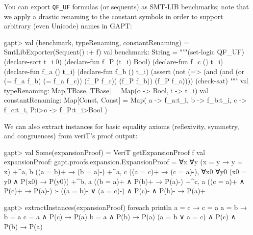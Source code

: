 \documentclass[a4paper,11pt]{book}
\begin{document}
You can export \verb,QF_UF, formulas (or sequents) as SMT-LIB benchmarks;
note that we apply a drastic renaming to the constant symbols in order to
support arbitrary (even Unicode) names in GAPT:
\begin{clilisting}
gapt> val (benchmark, typeRenaming, constantRenaming) = SmtLibExporter(Sequent() :+ f)
val benchmark: String = """(set-logic QF_UF)
(declare-sort t_i 0)
(declare-fun f_P (t_i) Bool)
(declare-fun f_c () t_i)
(declare-fun f_a () t_i)
(declare-fun f_b () t_i)
(assert
  (not
    (=> (and (and (or (= f_a f_b) (= f_a f_c)) (f_P f_c)) (f_P f_b))
      (f_P f_a))))
(check-sat)
"""
val typeRenaming: Map[TBase, TBase] = Map(o -> Bool, i -> t_i)
val constantRenaming: Map[Const, Const] = Map(
  a -> f_a:t_i,
  b -> f_b:t_i,
  c -> f_c:t_i,
  P:i>o -> f_P:t_i>Bool
)

\end{clilisting}

We can also extract instances for basic equality axioms (reflexivity, symmetry,
and congruences) from veriT's proof output:
\begin{clilisting}
gapt> val Some(expansionProof) = VeriT getExpansionProof f
  val expansionProof: gapt.proofs.expansion.ExpansionProof =
  ∀x ∀y (x = y → y = x)
  +^{a, b} ((a = b)+ → (b = a)-)
  +^{a, c} ((a = c)+ → (c = a)-),
  ∀x0 ∀y0 (x0 = y0 ∧ P(x0) → P(y0))
  +^{b, a} ((b = a)+ ∧ P(b)+ → P(a)-)
  +^{c, a} ((c = a)+ ∧ P(c)+ → P(a)-)
  :-
  ((a = b)- ∨ (a = c)-) ∧ P(c)- ∧ P(b)- → P(a)+

gapt> extractInstances(expansionProof) foreach println
  a = c → c = a
  a = b → b = a
  c = a ∧ P(c) → P(a)
  b = a ∧ P(b) → P(a)
  (a = b ∨ a = c) ∧ P(c) ∧ P(b) → P(a)

\end{clilisting}
\end{document}
